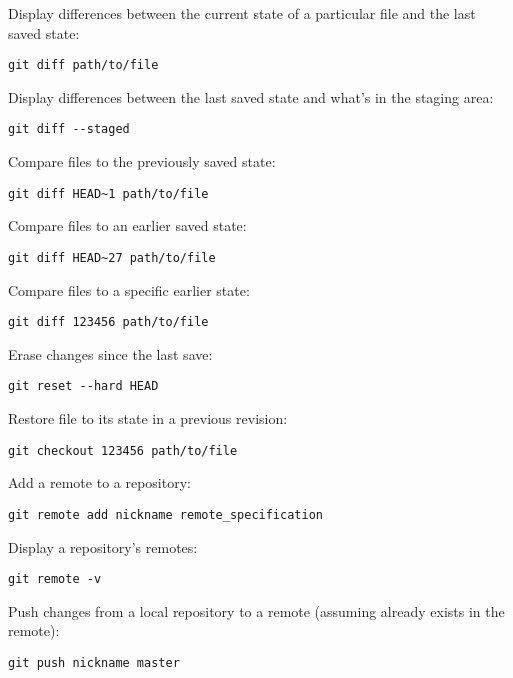 Display differences between the current state of a particular file and
the last saved state:

\begin{Verbatim}
git diff path/to/file
\end{Verbatim}

Display differences between the last saved state and what's in the
staging area:

\begin{Verbatim}
git diff --staged
\end{Verbatim}

Compare files to the previously saved state:

\begin{Verbatim}
git diff HEAD~1 path/to/file
\end{Verbatim}

Compare files to an earlier saved state:

\begin{Verbatim}
git diff HEAD~27 path/to/file
\end{Verbatim}

Compare files to a specific earlier state:

\begin{Verbatim}
git diff 123456 path/to/file
\end{Verbatim}

Erase changes since the last save:

\begin{Verbatim}
git reset --hard HEAD
\end{Verbatim}

Restore file to its state in a previous revision:

\begin{Verbatim}
git checkout 123456 path/to/file
\end{Verbatim}

Add a remote to a repository:

\begin{Verbatim}
git remote add nickname remote_specification
\end{Verbatim}

Display a repository's remotes:

\begin{Verbatim}
git remote -v
\end{Verbatim}

Push changes from a local repository to a remote (assuming
 already exists in the remote):

\begin{Verbatim}
git push nickname master
\end{Verbatim}


